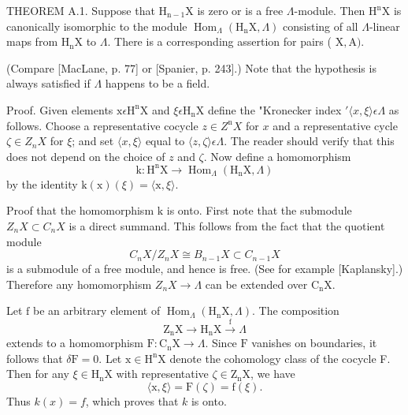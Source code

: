\documentclass[10pt]{article}
\begin{document}
THEOREM A.1. Suppose that $\mathrm{H}_{\mathrm{n}-1} \mathrm{X}$ is zero or is a free $\Lambda$-module. Then $\mathrm{H}^{\mathrm{n}} \mathrm{X}$ is canonically isomorphic to the module $\operatorname{Hom}_{\Lambda}\left(\mathrm{H}_{\mathrm{n}} \mathrm{X}, \Lambda\right)$ consisting of all $\Lambda$-linear maps from $\mathrm{H}_{\mathrm{n}} \mathrm{X}$ to $\Lambda$. There is a corresponding assertion for pairs ( $\mathrm{X}, \mathrm{A})$.

(Compare [MacLane, p. 77] or [Spanier, p. 243].) Note that the hypothesis is always satisfied if $\Lambda$ happens to be a field.

Proof. Given elements $\mathrm{x} \epsilon \mathrm{H}^{\mathrm{n}} \mathrm{X}$ and $\xi \epsilon \mathrm{H}_{\mathrm{n}} \mathrm{X}$ define the "Kronecker index $\prime\langle x, \xi\rangle \epsilon \Lambda$ as follows. Choose a representative cocycle $z \in Z^{\mathrm{n}} X$ for $x$ and a representative cycle $\zeta \in Z_{n} X$ for $\xi$; and set $\langle x, \xi\rangle$ equal to $\langle z, \zeta\rangle \epsilon \Lambda$. The reader should verify that this does not depend on the choice of $z$ and $\zeta$. Now define a homomorphism
$$
\mathrm{k}: \mathrm{H}^{\mathrm{n}} \mathrm{X} \rightarrow \operatorname{Hom}_{\Lambda}\left(\mathrm{H}_{\mathrm{n}} \mathrm{X}, \Lambda\right)
$$
by the identity $\mathrm{k}(\mathrm{x})(\xi)=\langle\mathrm{x}, \xi\rangle$.

Proof that the homomorphism $\mathrm{k}$ is onto. First note that the submodule $Z_{n} X \subset C_{n} X$ is a direct summand. This follows from the fact that the quotient module
$$
C_{n} X / Z_{n} X \cong B_{n-1} X \subset C_{n-1} X
$$
is a submodule of a free module, and hence is free. (See for example [Kaplansky].) Therefore any homomorphism $Z_{n} X \rightarrow \Lambda$ can be extended over $\mathrm{C}_{\mathrm{n}} \mathrm{X}$.

Let $\mathrm{f}$ be an arbitrary element of $\operatorname{Hom}_{\Lambda}\left(\mathrm{H}_{\mathrm{n}} \mathrm{X}, \Lambda\right)$. The composition
$$
\mathrm{Z}_{\mathrm{n}} \mathrm{X} \longrightarrow \mathrm{H}_{\mathrm{n}} \mathrm{X} \stackrel{\mathrm{f}}{\longrightarrow} \Lambda
$$
extends to a homomorphism $\mathrm{F}: \mathrm{C}_{\mathrm{n}} \mathrm{X} \rightarrow \Lambda$. Since $\mathrm{F}$ vanishes on boundaries, it follows that $\delta \mathrm{F}=0$. Let $\mathrm{x} \in \mathrm{H}^{\mathrm{n}} \mathrm{X}$ denote the cohomology class of the cocycle F. Then for any $\xi \in \mathrm{H}_{\mathrm{n}} \mathrm{X}$ with representative $\zeta \in \mathrm{Z}_{\mathrm{n}} \mathrm{X}$, we have
$$
\langle\mathrm{x}, \xi\rangle=\mathrm{F}(\zeta)=\mathrm{f}(\xi) .
$$
Thus $k(x)=f$, which proves that $k$ is onto.
\end{document}
